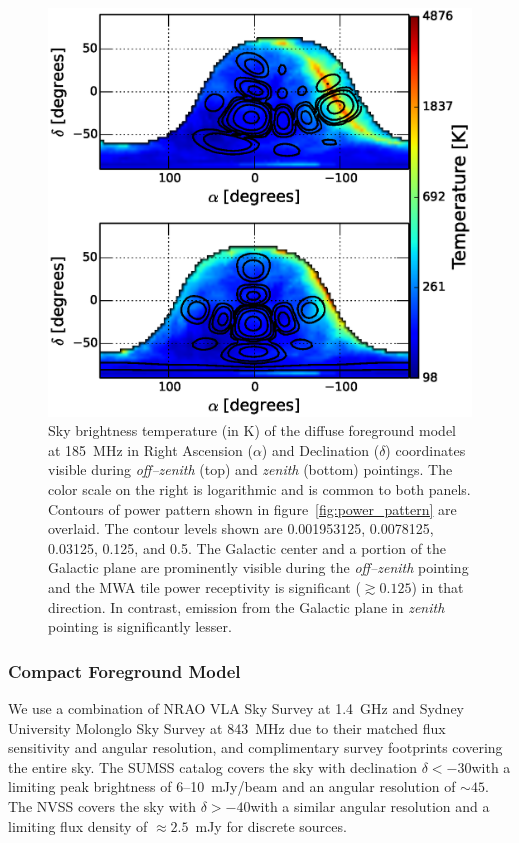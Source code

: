 \documentclass[preprint2,iop,numberedappendix]{emulateapj}
\begin{document}
\begin{figure}[htb]
\centering
\includegraphics[width=\linewidth]{figures/v1_0/dsm.eps}
\caption{Sky brightness temperature (in K) of the diffuse foreground model at 185~MHz in Right Ascension ($\alpha$) and Declination ($\delta$) coordinates visible during {\it off--zenith} (top) and {\it zenith} (bottom) pointings. The color scale on the right is logarithmic and is common to both panels. Contours of power pattern shown in figure~\ref{fig:power_pattern} are overlaid. The contour levels shown are 0.001953125, 0.0078125, 0.03125, 0.125, and 0.5. The Galactic center and a portion of the Galactic plane are prominently visible during the {\it off--zenith} pointing and the MWA tile power receptivity is significant ($\gtrsim 0.125$) in that direction. In contrast, emission from the Galactic plane in {\it zenith} pointing is significantly lesser. \label{fig:DSM}}
\end{figure}

\subsubsection{Compact Foreground Model}\label{sec:CSM}

We use a combination of NRAO VLA Sky Survey \citep[NVSS;][]{con98} at 1.4~GHz and Sydney University Molonglo Sky Survey \citep[SUMSS;][]{boc99,mau03} at 843~MHz due to their matched flux sensitivity and angular resolution, and complimentary survey footprints covering the entire sky. The SUMSS catalog covers the sky with declination $\delta < -30$\arcdeg with a limiting peak brightness of 6--10~mJy/beam and an angular resolution of $\sim 45$\arcsec. The NVSS covers the sky with $\delta > -40$\arcdeg with a similar angular resolution and a limiting flux density of $\approx 2.5$~mJy for discrete sources. 
\end{document}
